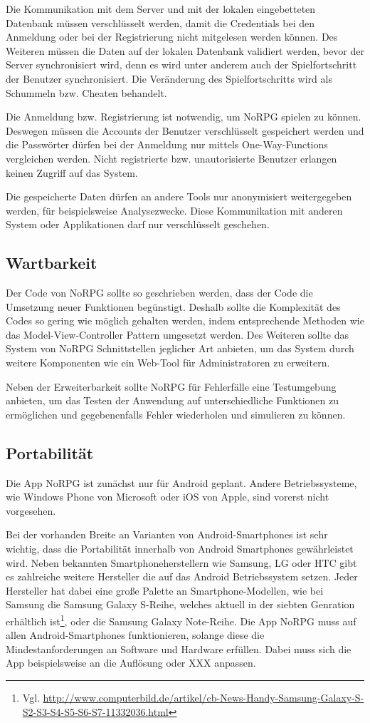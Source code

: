 {		Die Kommunikation mit dem Server und mit der lokalen eingebetteten Datenbank müssen verschlüsselt werden, damit die Credentials bei den Anmeldung oder bei der Registrierung nicht mitgelesen werden können. Des Weiteren müssen die Daten auf der lokalen Datenbank validiert werden, bevor der Server synchronisiert wird, denn es wird unter anderem auch der Spielfortschritt der Benutzer synchronisiert. Die Veränderung des Spielfortschritts wird als Schummeln bzw. Cheaten behandelt.
		
		Die Anmeldung bzw. Registrierung ist notwendig, um NoRPG spielen zu können. Deswegen müssen die Accounts der Benutzer verschlüsselt gespeichert werden und die Passwörter dürfen bei der Anmeldung nur mittels One-Way-Functions vergleichen werden. Nicht registrierte bzw. unautorisierte Benutzer erlangen keinen Zugriff auf das System.
		
		Die gespeicherte Daten dürfen an andere Tools nur anonymisiert weitergegeben werden, für beispielsweise Analysezwecke. Diese Kommunikation mit anderen System oder Applikationen darf nur verschlüsselt geschehen.
		
	\subsection{Wartbarkeit}
		Der Code von NoRPG sollte so geschrieben werden, dass der Code die Umsetzung neuer Funktionen begünstigt. Deshalb sollte die Komplexität des Codes so gering wie möglich gehalten werden, indem entsprechende Methoden wie das Model-View-Controller Pattern umgesetzt werden. Des Weiteren sollte das System von NoRPG Schnittstellen jeglicher Art anbieten, um das System durch weitere Komponenten wie ein Web-Tool für Administratoren zu erweitern.
		
		Neben der Erweiterbarkeit sollte NoRPG für Fehlerfälle eine Testumgebung anbieten, um das Testen der Anwendung auf unterschiedliche Funktionen zu ermöglichen und gegebenenfalls Fehler wiederholen und simulieren zu können.
		
	\subsection{Portabilität}
		Die App NoRPG ist zunächst nur für Android geplant. Andere Betriebssysteme, wie Windows Phone von Microsoft oder iOS von Apple, sind vorerst nicht vorgesehen. 
		
		Bei der vorhanden Breite an Varianten von Android-Smartphones ist sehr wichtig, dass die Portabilität innerhalb von Android Smartphones gewährleistet wird. Neben bekannten Smartphoneherstellern wie Samsung, LG oder HTC gibt es zahlreiche weitere Hersteller die auf das Android Betriebssystem setzen. Jeder Hersteller hat dabei eine große Palette an Smartphone-Modellen, wie bei Samsung die Samsung Galaxy S-Reihe, welches aktuell in der siebten Genration erhältlich ist\footnote{Vgl. \url{http://www.computerbild.de/artikel/cb-News-Handy-Samsung-Galaxy-S-S2-S3-S4-S5-S6-S7-11332036.html}}, oder die Samsung Galaxy Note-Reihe. Die App NoRPG muss auf allen Android-Smartphones funktionieren, solange diese die Mindestanforderungen an Software und Hardware erfüllen. Dabei muss sich die App beispielsweise an die Auflösung oder XXX anpassen.
		
}

